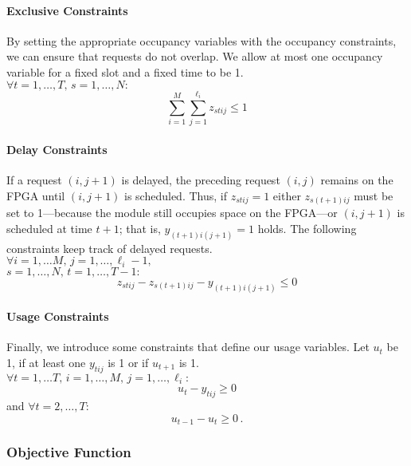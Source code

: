 \documentclass[10pt,journal]{IEEEtran}
\begin{document}
\medskip
\paragraph{Exclusive Constraints}
By setting the appropriate occupancy variables with the occupancy constraints,
we can ensure that requests do not overlap. We 
allow at most one occupancy variable for a fixed slot and a fixed time
to be 1.\\
$\forall t = 1, \ldots, T,\, s = 1, \ldots, N:$
\begin{equation}\label{fpgatris-ilp-excl}
\sum_{i=1}^{M}\sum_{j=1}^{\ell_i} z_{stij}\leq 1
\end{equation}

\medskip
\paragraph{Delay Constraints}
If a request $(i, j+1)$ is delayed, the preceding request $(i,j)$ remains
on the FPGA until $(i, j+1)$ is scheduled.
Thus, if $z_{stij}=1$ either $z_{s(t+1)ij}$ must be set to 1---because
the module still occupies space on the FPGA---or 
$(i, j+1)$ is scheduled at time $t+1$; that is,
$y_{(t+1)i(j+1)}=1$ holds. The following constraints keep track of
delayed requests.\\
$\forall i = 1, \ldots M,\,
j = 1, \ldots, \ell_i-1,\,$\\$
s = 1, \ldots, N,\,
t = 1, \ldots, T-1:$
\begin{equation}\label{fpgatris-ilp-nopreemp}
z_{stij} - z_{s(t+1)ij} - y_{(t+1)i(j+1)}\leq 0
\end{equation}

\medskip
\paragraph{Usage Constraints}
Finally, we introduce some constraints that define our usage variables.
Let $u_t$ be 1, if at least one $y_{tij}$ is 1 or if 
$u_{t+1}$ is 1.\\
$\forall t = 1, \ldots T,\,
i = 1, \ldots, M,\, j = 1, \ldots, \ell_i:$
\begin{equation}\label{fpgatris-ilp-defineu1}
u_{t}- y_{tij}\geq 0
\end{equation}
and $\forall t = 2, \ldots, T:$
\begin{equation}\label{fpgatris-ilp-defineu2}
u_{t-1}- u_{t}\geq 0\,.
\end{equation}

\subsubsection{Objective Function}
\end{document}
